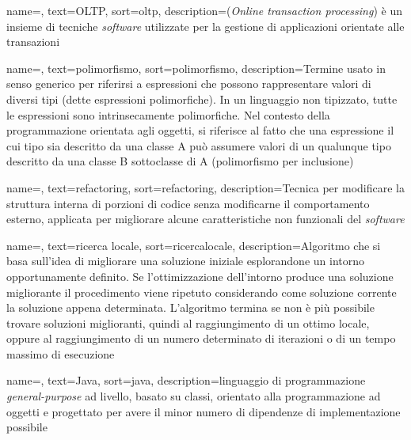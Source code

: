 {
    name=,
    text=OLTP,
    sort=oltp,
    description={(\textit{Online transaction processing}) è un insieme di tecniche \textit{software} utilizzate per
    la gestione di applicazioni orientate alle transazioni \cite{site:wiki}}
}

{
    name=,
    text=polimorfismo,
    sort=polimorfismo,
    description={Termine usato in senso generico
    per riferirsi a espressioni che possono rappresentare valori di diversi tipi (dette
    espressioni polimorfiche). In un linguaggio non tipizzato, tutte le espressioni
    sono intrinsecamente polimorfiche. Nel contesto della programmazione orientata
    agli oggetti, si riferisce al fatto che una espressione il cui tipo sia descritto da
    una classe A può assumere valori di un qualunque tipo descritto da una classe B
    sottoclasse di A (polimorfismo per inclusione) \cite{site:wiki}}
}

{
    name=,
    text=refactoring,
    sort=refactoring,
    description={Tecnica per modificare la struttura interna di porzioni di codice
    senza modificarne il comportamento esterno, applicata per migliorare alcune
    caratteristiche non funzionali del \textit{software} \cite{Addison-Wesley:software-engineering}}
}

{
    name=,
    text=ricerca locale,
    sort=ricercalocale,
    description={Algoritmo che si basa sull’idea di migliorare
    una soluzione iniziale esplorandone un intorno
    opportunamente definito. Se l’ottimizzazione
    dell’intorno produce una soluzione migliorante
    il procedimento viene ripetuto
    considerando come soluzione corrente la soluzione
    appena determinata. L’algoritmo termina se non è più
    possibile trovare soluzioni miglioranti, quindi al
    raggiungimento di un ottimo locale, oppure al
    raggiungimento di un numero
    determinato di iterazioni o di un tempo massimo di esecuzione \cite{site:dispense-de-giovanni}}
}

{
    name=,
    text=Java,
    sort=java,
    description={linguaggio di programmazione
    \textit{general-purpose} ad livello, basato su classi, orientato alla programmazione ad oggetti e
    progettato
    per avere il minor numero di dipendenze di implementazione
    possibile \cite{site:wiki}}
}

